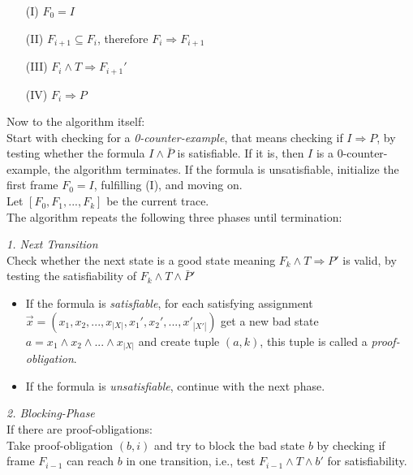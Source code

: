 \documentclass[11pt, a4paper, BCOR=10mm, ngerman]{scrbook}
\begin{document}
\begin{itemize}
\item[(I)] $F_0 = I$
\item[(II)] $F_{i+1} \subseteq F_{i}$, therefore $F_i \Rightarrow F_{i+1}$
\item[(III)] $F_i \land T \Rightarrow F_{i+1}'$
\item[(IV)] $F_i \Rightarrow P$
\end{itemize}

Now to the algorithm itself: \\
Start with checking for a \textsl{0-counter-example}, that means checking if $I \Rightarrow P$, by testing whether the formula $I \land \bar P$ is satisfiable. If it is, then $I$ is a 0-counter-example, the algorithm terminates.
If the formula is unsatisfiable, initialize the first frame $F_0 = I$, fulfilling (I), and moving on. \\

Let $[F_0, F_1, ..., F_k]$ be the current trace. \\ 
The algorithm repeats the following three phases until termination: \par

\textsl{1. Next Transition} \\ Check whether the next state is a good state meaning $F_k \land T \Rightarrow P'$ is valid, by testing the satisfiability of $F_k \land T \land \bar P'$ 
\begin{itemize}
\item If the formula is \textsl{satisfiable}, for each satisfying assignment \\ $\vec{x} = (x_1, x_2, ..., x_{|X|}, x_1', x_2', ..., x'_{|X'|})$ get a new bad state \\ $a = x_1 \land x_2 \land ... \land x_{|X|}$ and create tuple $(a, k)$, this tuple is called a \textsl{proof-obligation}.

\item If the formula is \textsl{unsatisfiable}, continue with the next phase. \\

\end{itemize}


\textsl{2. Blocking-Phase} \\If there are proof-obligations: \\ 
Take proof-obligation $(b, i)$ and try to block the bad state $b$ by checking if frame $F_{i-1}$ can reach $b$ in one transition, i.e., test $F_{i-1} \land T \land b'$ for satisfiability.
\end{document}
